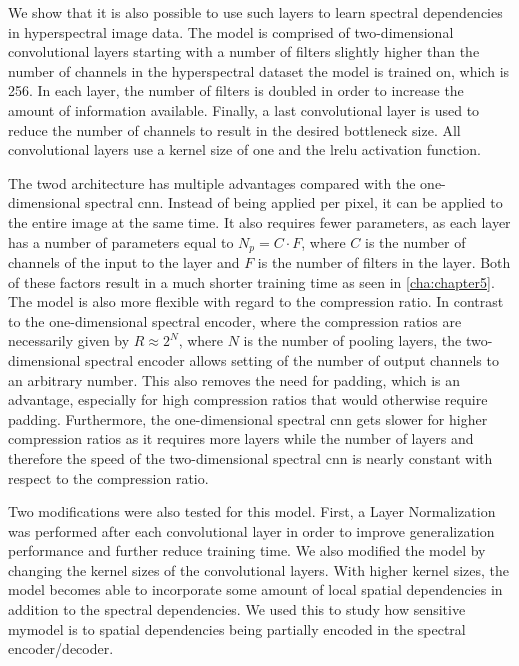 We show that it is also possible to use such layers to learn spectral dependencies in hyperspectral image data. The model is comprised of two-dimensional convolutional layers starting with a number of filters slightly higher than the number of channels in the hyperspectral dataset the model is trained on, which is 256. In each layer, the number of filters is doubled in order to increase the amount of information available. Finally, a last convolutional layer is used to reduce the number of channels to result in the desired bottleneck size. All convolutional layers use a kernel size of one and the \ac{lrelu} activation function.

The \ac{twod} architecture has multiple advantages compared with the one-dimensional spectral \ac{cnn}. Instead of being applied per pixel, it can be applied to the entire image at the same time. It also requires fewer parameters, as each layer has a number of parameters equal to $N_p = C \cdot F$, where $C$ is the number of channels of the input to the layer and $F$ is the number of filters in the layer. Both of these factors result in a much shorter training time as seen in \autoref{cha:chapter5}. The model is also more flexible with regard to the compression ratio. In contrast to the one-dimensional spectral encoder, where the compression ratios are necessarily given by $R \approx 2^N$, where $N$ is the number of pooling layers, the two-dimensional spectral encoder allows setting of the number of output channels to an arbitrary number. This also removes the need for padding, which is an advantage, especially for high compression ratios that would otherwise require padding. Furthermore, the one-dimensional spectral \ac{cnn} gets slower for higher compression ratios as it requires more layers while the number of layers and therefore the speed of the two-dimensional spectral \ac{cnn} is nearly constant with respect to the compression ratio.

Two modifications were also tested for this model. First, a Layer Normalization was performed after each convolutional layer in order to improve generalization performance and further reduce training time.  We also modified the model by changing the kernel sizes of the convolutional layers. With higher kernel sizes, the model becomes able to incorporate some amount of local spatial dependencies in addition to the spectral dependencies. We used this to study how sensitive \ac{mymodel} is to spatial dependencies being partially encoded in the spectral encoder/decoder.
